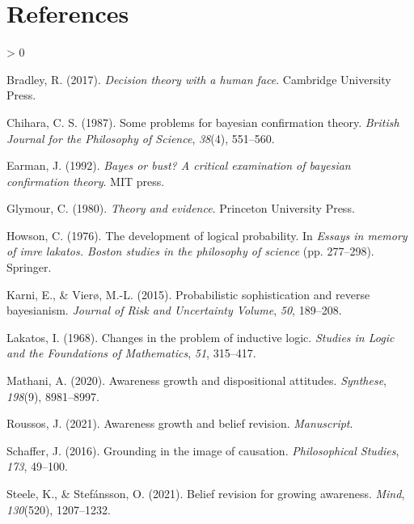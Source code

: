 \documentclass[
  11pt,
  dvipsnames,enabledeprecatedfontcommands]{scrartcl}
\newlength{\cslhangindent}
\newenvironment{CSLReferences}[2] %
 {%
  \setlength{\parindent}{0pt}
  \ifodd #1 \everypar{\setlength{\hangindent}{\cslhangindent}}\ignorespaces\fi
  \ifnum #2 > 0
  \setlength{\parskip}{#2\baselineskip}
  \fi
 }%
 {}
\begin{document}
\singlespace

\hypertarget{references}{%
\section*{References}\label{references}}

\hypertarget{refs}{}
\begin{CSLReferences}{1}{0}
\leavevmode\hypertarget{ref-bradley2017}{}%
Bradley, R. (2017). \emph{Decision theory with a human face}. Cambridge
University Press.

\leavevmode\hypertarget{ref-chihara1987}{}%
Chihara, C. S. (1987). Some problems for bayesian confirmation theory.
\emph{British Journal for the Philosophy of Science}, \emph{38}(4),
551--560.

\leavevmode\hypertarget{ref-eerman1992}{}%
Earman, J. (1992). \emph{Bayes or bust? A critical examination of
bayesian confirmation theory}. MIT press.

\leavevmode\hypertarget{ref-glymour1980}{}%
Glymour, C. (1980). \emph{Theory and evidence}. Princeton University
Press.

\leavevmode\hypertarget{ref-howson1976}{}%
Howson, C. (1976). The development of logical probability. In
\emph{Essays in memory of imre lakatos. Boston studies in the philosophy
of science} (pp. 277--298). Springer.

\leavevmode\hypertarget{ref-karniViero2015}{}%
Karni, E., \& Vierø, M.-L. (2015). Probabilistic sophistication and
reverse bayesianism. \emph{Journal of Risk and Uncertainty Volume},
\emph{50}, 189--208.

\leavevmode\hypertarget{ref-lakatos1968}{}%
Lakatos, I. (1968). Changes in the problem of inductive logic.
\emph{Studies in Logic and the Foundations of Mathematics}, \emph{51},
315--417.

\leavevmode\hypertarget{ref-mathani2020}{}%
Mathani, A. (2020). Awareness growth and dispositional attitudes.
\emph{Synthese}, \emph{198}(9), 8981--8997.

\leavevmode\hypertarget{ref-roussos2021}{}%
Roussos, J. (2021). Awareness growth and belief revision.
\emph{Manuscript}.

\leavevmode\hypertarget{ref-schaffer2016}{}%
Schaffer, J. (2016). Grounding in the image of causation.
\emph{Philosophical Studies}, \emph{173}, 49--100.

\leavevmode\hypertarget{ref-steeleStefansson2021}{}%
Steele, K., \& Stefánsson, O. (2021). Belief revision for growing
awareness. \emph{Mind}, \emph{130}(520), 1207--1232.


\end{CSLReferences}
\end{document}
